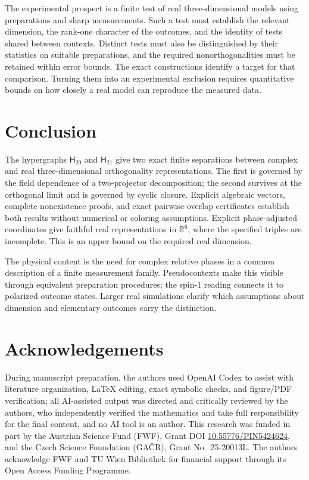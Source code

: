 \documentclass[12pt,a4paper]{article}
\theoremstyle{definition}
\theoremstyle{remark}
\newcommand{\R}{\mathbb R}
\newcommand{\Htwenty}{\mathsf H_{20}}
\newcommand{\Htwentyone}{\mathsf H_{21}}
\begin{document}
The experimental prospect is a finite test of real three-dimensional
models using preparations and sharp measurements.  Such a test must
establish the relevant dimension, the rank-one character of the outcomes,
and the identity of tests shared between contexts.  Distinct tests must
also be distinguished by their statistics on suitable preparations, and
the required nonorthogonalities must be retained within error bounds.
The exact constructions identify a target for that comparison.  Turning
them into an experimental exclusion requires quantitative bounds on how
closely a real model can reproduce the measured data.

\section{Conclusion}

The hypergraphs $\Htwenty$ and $\Htwentyone$ give two exact finite
separations between complex and real three-dimensional orthogonality
representations.  The first is governed by the field dependence of a
two-projector decomposition; the second survives at the orthogonal limit
and is governed by cyclic closure.  Explicit algebraic vectors,
complete nonexistence proofs, and exact pairwise-overlap certificates
establish both results without numerical or coloring assumptions.  Explicit
phase-adjusted coordinates give faithful real representations in $\R^6$,
where the specified triples are incomplete.  This is an upper bound on
the required real dimension.


The physical content is the need for complex relative phases in a common
description of a finite measurement family.  Pseudocontexts make this
visible through equivalent preparation procedures; the spin-1 reading
connects it to polarized outcome states.  Larger real simulations clarify
which assumptions about dimension and elementary outcomes carry the
distinction.

\section*{Acknowledgements}

During manuscript preparation, the authors used OpenAI Codex to assist with literature organization, LaTeX editing, exact symbolic checks, and figure/PDF verification; all AI-assisted output was directed and critically reviewed by the authors, who independently verified the mathematics and take full responsibility for the final content, and no AI tool is an author.
This research was funded in part by the Austrian
Science Fund (FWF), Grant DOI \href{https://doi.org/10.55776/PIN5424624}{10.55776/PIN5424624}, and the Czech Science
Foundation (GA\v{C}R), Grant No.~25-20013L.
The authors acknowledge FWF and TU Wien Bibliothek for financial support through its Open Access Funding Programme.
\end{document}
